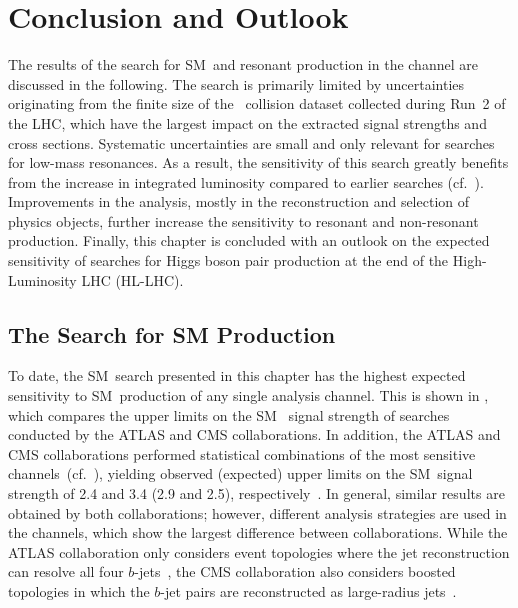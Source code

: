 \section{Conclusion and Outlook}%
\label{sec:result_discussion}

The results of the search for SM~\HH and resonant \HH production in the
\bbtautau channel are discussed in the following. The search is primarily
limited by uncertainties originating from the finite size of the \pp~collision
dataset collected during Run~2 of the LHC, which have the largest impact on the
extracted signal strengths and cross sections. Systematic uncertainties are
small and only relevant for searches for low-mass resonances. As a result, the
sensitivity of this search greatly benefits from the increase in integrated
luminosity compared to earlier searches
(cf.~). Improvements in the analysis, mostly in
the reconstruction and selection of physics objects, further increase the
sensitivity to resonant and non-resonant \HH production. Finally, this chapter
is concluded with an outlook on the expected sensitivity of searches for Higgs
boson pair production at the end of the High-Luminosity LHC (HL-LHC).

\subsection{The Search for SM \HH Production}

To date, the SM~\HH search presented in this chapter has the highest expected
sensitivity to SM~\HH production of any single analysis channel. This is shown
in , which compares the upper limits on the SM~\HH
signal strength of searches conducted by the ATLAS and CMS collaborations. In
addition, the ATLAS and CMS collaborations performed statistical combinations of
the most sensitive channels~(cf.~), yielding observed
(expected) upper limits on the SM~\HH signal strength of 2.4 and 3.4 (2.9 and
2.5), respectively~\cite{HDBS-2022-03,CMS-HIG-22-001}.
In general, similar results are obtained by both collaborations; however,
different analysis strategies are used in the \bbbb channels, which show the
largest difference between collaborations. While the ATLAS collaboration only
considers event topologies where the jet reconstruction can resolve all four
$b$-jets~\cite{HDBS-2019-29}, the CMS collaboration also considers boosted
topologies in which the $b$-jet pairs are reconstructed as large-radius
jets~\cite{CMS-HIG-20-005,CMS-B2G-22-003}.

